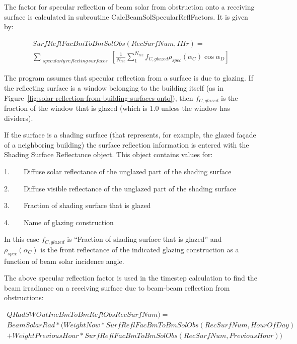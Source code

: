 The factor for specular reflection of beam solar from obstruction onto a receiving surface is calculated in subroutine CalcBeamSolSpecularReflFactors. It is given by:

\begin{equation}
\begin{split}
{SurfReflFacBmToBmSolObs(RecSurfNum,IHr) } =
\\\sum\limits_{\scriptstyle \substack{specularly \, reflecting \, surfaces}} \left[ {\frac{1}{{{N_{rec}}}}\sum\limits_1^{{N_{rec}}} {{f_{C,glazed}}{\rho_{spec}}({\alpha_C})\cos {\alpha_D}} } \right]
\end{split}
\end{equation}

The program assumes that specular reflection from a surface is due to glazing. If the reflecting surface is a window belonging to the building itself (as in Figure~\ref{fig:solar-reflection-from-building-surfaces-onto}), then \({f_{C,glazed}}\) is the fraction of the window that is glazed (which is 1.0 unless the window has dividers).

If the surface is a shading surface (that represents, for example, the glazed façade of a neighboring building) the surface reflection information is entered with the Shading Surface Reflectance object. This object contains values for:

1.~~~~Diffuse solar reflectance of the unglazed part of the shading surface

2.~~~~Diffuse visible reflectance of the unglazed part of the shading surface

3.~~~~Fraction of shading surface that is glazed

4.~~~~Name of glazing construction

In this case \({f_{C,glazed}}\) is ``Fraction of shading surface that is glazed'' and \({\rho_{spec}}({\alpha_C})\) is the front reflectance of the indicated glazing construction as a function of beam solar incidence angle.

The above specular reflection factor is used in the timestep calculation to find the beam irradiance on a receiving surface due to beam-beam reflection from obstructions:

\begin{equation}
\begin{split}
QRadSWOutIncBmToBmReflObsRecSurfNum) =
\\BeamSolarRad * (WeightNow * SurfReflFacBmToBmSolObs(RecSurfNum,HourOfDay)
\\+ WeightPreviousHour * SurfReflFacBmToBmSolObs(RecSurfNum,PreviousHour))
\end{split}
\end{equation}
